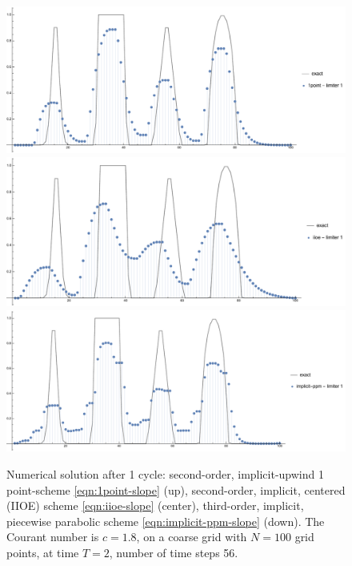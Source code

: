 \documentclass[../thesis.tex]{subfiles}
\begin{document}
\begin{figure}[H]
	\centering
	\includegraphics[width=\textwidth]{fig-1point-c1p8-T2-limit1-shu.pdf}
	\includegraphics[width=\textwidth]{fig-iioe-c1p8-T2-limit1-shu.pdf}
	\includegraphics[width=\textwidth]{fig-implicit-ppm-c1p8-T2-limit1-shu.pdf}
	\caption{Numerical solution after 1 cycle: second-order, implicit-upwind 1 point-scheme \eqref{eqn:1point-slope} (up), second-order, implicit, centered (IIOE) scheme \eqref{eqn:iioe-slope} (center), third-order, implicit, piecewise parabolic scheme \eqref{eqn:implicit-ppm-slope} (down). The Courant number is \(c = 1.8\), on a coarse grid with \(N = 100\) grid points, at time \(T = 2\), number of time steps 56.}
	\label{fig:c1p8-T2-limit1-shu}
\end{figure}
\end{document}
